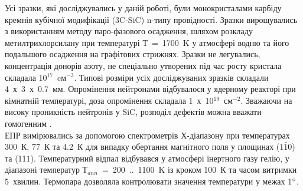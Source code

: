 Усі зразки, які досліджувались у даній роботі, були монокристалами карбіду кремнія кубічної модифікації (3C-SiC) n-типу провідності. Зразки вирощувались з використанням методу паро-фазового осадження, шляхом розкладу метилтрихлорсилану при температурі Т~=~1700~K у атмосфері водню та його подальшого осадження на графітових стрижнях. Зразки не легувались, концентрація донорів азоту, не спеціально утворених під час росту кристала складала 10$^{17}$~cм$^{-3}$. Типові розміри усіх досліджуваних зразків складали 4~х~3~х~0.7~мм. Опромінення нейтронами відбувалося у ядерному реакторі при кімнатній температурі, доза опромінення складала 1~х~10$^{19}$~см$^{-2}$. Зважаючи на високу проникність нейтронів у SiC, розподіл дефектів можна вважати гомогенним \citep{neut}.\\
 ЕПР вимірювались за допомогою спектрометрів Х-діапазону при температурах 300~К, 77~К та 4.2~К для випадку обертання магнітного поля у площинах ($1\bar{1}0$) та (111). Температурний відпал відбувався у атмосфері інертного газу гелію, у діапазоні температур Т$_{ann}$~=~200~..~1100~K із кроком 100~К та часом витримки 5~хвилин. Термопара дозволяла контролювати значення температури у межах 1$\degree$.
